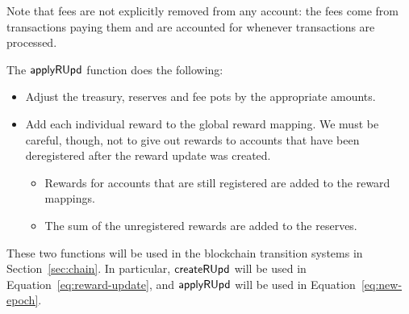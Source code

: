 Note that fees are not explicitly removed from any account:
the fees come from transactions paying them and are accounted for whenever
transactions are processed.

The $\mathsf{applyRUpd}$ function does the following:
    \begin{itemize}
      \item Adjust the treasury, reserves and fee pots by the appropriate amounts.
      \item Add each individual reward to the global reward mapping.
        We must be careful, though, not to give out rewards to accounts
        that have been deregistered after the reward update was created.
        \begin{itemize}
          \item Rewards for accounts that are still registered are added to the reward mappings.
          \item The sum of the unregistered rewards are added to the reserves.
        \end{itemize}
    \end{itemize}

These two functions will be used in the blockchain transition systems in Section~\ref{sec:chain}.
In particular,
$\mathsf{createRUpd}$ will be used in Equation~\ref{eq:reward-update},
and $\mathsf{applyRUpd}$ will be used in Equation~\ref{eq:new-epoch}.

